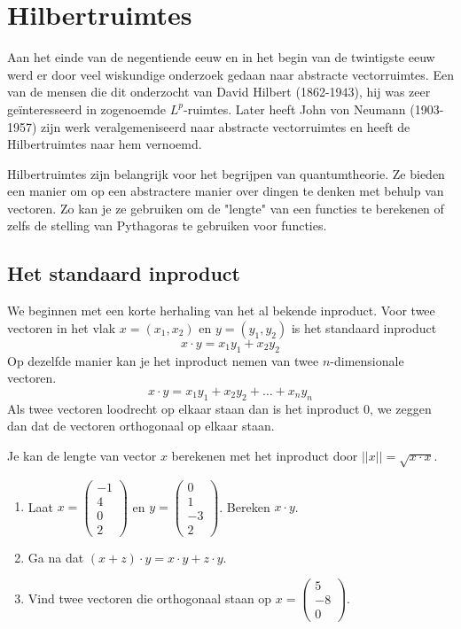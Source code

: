 \documentclass[../main.tex]{subfiles}
\begin{document}
\onlyinsubfile{
\setcounter{chapter}{3}
}
\notinsubfile{}

\section{Hilbertruimtes}\label{sec:POHilbert}


Aan het einde van de negentiende eeuw en in het begin van de twintigste eeuw werd er door veel wiskundige onderzoek gedaan naar abstracte vectorruimtes. Een van de mensen die dit onderzocht van David Hilbert (1862-1943), hij was zeer geïnteresseerd in zogenoemde $L^p$-ruimtes. Later heeft John von Neumann (1903-1957) zijn werk veralgemeniseerd naar abstracte vectorruimtes en heeft de Hilbertruimtes naar hem vernoemd.

Hilbertruimtes zijn belangrijk voor het begrijpen van quantumtheorie. Ze bieden een manier om op een abstractere manier over dingen te denken met behulp van vectoren. Zo kan je ze gebruiken om de "lengte" van een functies te berekenen of zelfs de stelling van Pythagoras te gebruiken voor functies.


\subsection*{Het standaard inproduct}
We beginnen met een korte herhaling van het al bekende inproduct. 
Voor twee vectoren in het vlak $x=(x_1,x_2)$ en $y=(y_1,y_2)$ is het standaard inproduct
\[x\cdot y =x_1y_1+x_2y_2\]
Op dezelfde manier kan je het inproduct nemen van twee $n$-dimensionale vectoren.
\[x\cdot y=x_1y_1+x_2y_2+\ldots+x_ny_n\]
Als twee vectoren loodrecht op elkaar staan dan is het inproduct 0, we zeggen dan dat de vectoren orthogonaal op elkaar staan.

Je kan de lengte van vector $x$ berekenen met het inproduct door $||x||=\sqrt{x\cdot x}$.

\begin{opdracht}
\begin{enumerate}
    \item Laat $x=\begin{pmatrix}-1\\4\\0\\2\end{pmatrix}$ en $y=\begin{pmatrix}0\\1\\-3\\2\end{pmatrix}$. Bereken $x\cdot y$.
    \item Ga na dat $(x+z)\cdot y=x\cdot y+ z\cdot y$.
    \item Vind twee vectoren die orthogonaal staan op $x=\begin{pmatrix}5\\-8\\0\end{pmatrix}$.
\end{enumerate}
\end{opdracht}
\end{document}
